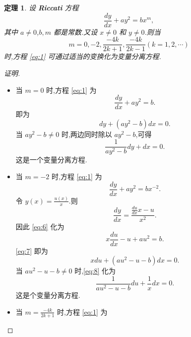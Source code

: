 \documentclass[a4paper, 12pt]{article} %
\newtheorem*{adtheorem}{定理}
\newenvironment{theorem}
{\bigskip\begin{mdframed}[backgroundcolor=gray!40,rightline=false,leftline=false,topline=false,bottomline=false]\begin{adtheorem}}
    {\end{adtheorem}\end{mdframed}\bigskip}
\begin{document}
\begin{CJK}{UTF8}{gkai}
  \begin{theorem}
    设 \textbf{Riccati} 方程
    \begin{equation}
      \label{eq:1}
      \frac{dy}{dx}+ay^2=bx^m,
    \end{equation}
    其中 $a\neq 0$,$b,m$ 都是常数.又设 $x\neq 0$ 和 $y\neq 0$.则当
    \begin{equation}
      \label{eq:2}
      m=0,-2,\frac{-4k}{2k+1},\frac{-4k}{2k-1}(k=1,2,\cdots)
    \end{equation}
    时,方程 \eqref{eq:1} 可通过适当的变换化为变量分离方程.
  \end{theorem}
  \begin{proof}[证明]
    \begin{itemize}
    \item 当 $m=0$ 时,方程 \eqref{eq:1} 为
      \begin{equation}
        \label{eq:3}
        \frac{dy}{dx}+ay^2=b.
      \end{equation}
      即为
      \begin{equation}
        \label{eq:4}
        dy+(ay^2-b)dx=0.
      \end{equation}
      当 $ay^2-b\neq 0$ 时,两边同时除以 $ay^2-b$,可得
      \begin{equation}
        \label{eq:5}
        \frac{1}{ay^2-b}dy+dx=0.
      \end{equation}
      这是一个变量分离方程.
    \item 当 $m=-2$ 时,方程 \eqref{eq:1} 为
      \begin{equation}
        \label{eq:6}
          \frac{dy}{dx}+ay^2=bx^{-2}.
      \end{equation}
令 $y(x)=\frac{u(x)}{x}$.则
$$
\frac{dy}{dx}=\frac{\frac{du}{dx}x-u}{x^2}.
$$
因此 \eqref{eq:6} 化为
\begin{equation}
  \label{eq:7}
  x\frac{du}{dx}-u+au^2=b.
\end{equation}
\eqref{eq:7} 即为
\begin{equation}
  \label{eq:8}
  xdu+(au^2-u-b)dx=0.
\end{equation}
当 $au^2-u-b\neq 0$ 时,\eqref{eq:8} 化为
\begin{equation}
  \label{eq:9}
  \frac{1}{au^2-u-b}du+\frac{1}{x}dx=0.
\end{equation}
这是个变量分离方程.
\item 当 $m=\frac{-4k}{2k+1}$ 时,方程 \eqref{eq:1} 为

\end{itemize}
\end{proof}
\end{CJK}
\end{document}
